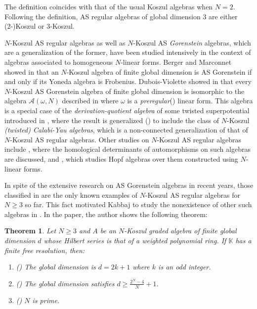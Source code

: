 \documentclass[reqno]{amsart}
\newcommand{\A}{\mathcal{A}}
\newcommand{\bbK}{\mathbb{K}}
\numberwithin{equation}{section}
\theoremstyle{plain}
\newtheorem{thm}[equation]{Theorem}
\theoremstyle{definition}
\begin{document}
The definition coincides with that of the usual Koszul algebras when $N=2$. Following the definition, AS regular algebras of global dimension 3 are either (2-)Koszul or 3-Koszul. 

$N$-Koszul AS regular algebras as well as $N$-Koszul AS \emph{Gorenstein} algebras, which are a generalization of the former, have been studied intensively in the context of algebras associated to homogeneous $N$-linear forms. Berger and Marconnet showed in \cite[Theorem 1.2]{BergerMarconnet} that an $N$-Koszul algebra of finite global dimension is AS Gorenstein if and only if its Yoneda algebra is Frobenius. Dubois-Violette showed in \cite[Theorem 11]{DuboisViolette} that every 
$N$-Koszul AS Gorenstein algebra of finite global dimension is isomorphic to the algebra $\A(\omega, N)$ described in \cite[Section 5]{DuboisViolette} where $\omega$ is a \emph{preregular}(\cite[Definition 2]{DuboisViolette}) linear form. This algebra is a special case of the \emph{derivation-quotient algebra} of some twisted superpotential introduced in \cite{BocklandtSchedlerWemyss}, where the result \cite[Theorem 11]{DuboisViolette} is generalized (\cite[Theorem 6.2]{BocklandtSchedlerWemyss}) to include the class of $N$-Koszul \emph{(twisted) Calabi-Yau algebras}, which is a non-connected generalization of that of $N$-Koszul AS regular algebras. Other studies on $N$-Koszul AS regular algebras include \cite{MoriSmith}, where the homological determinants of automorphisms on such algebras are discussed, and \cite{ChirvasituWaltonWang}, which studies Hopf algebras over them constructed using $N$-linear forms.

In spite of the extensive research on AS Gorenstein algebras in recent years, those classified in \cite{ArtinTateVandenBerghelliptic} are the only known examples of $N$-Koszul AS regular algebras for $N\geq 3$ so far. This fact motivated Kabbaj to study the nonexistence of other such algebras in \cite{Kabbaj}. In the paper, the author shows the following theorem:

\begin{thm}\cite[Theorem 1.2]{Kabbaj}\label{Kabbajmain}
Let $N\geq 3$ and $A$ be an $N$-Koszul graded algebra of finite global dimension $d$ whose Hilbert series is that of a weighted polynomial ring. If $\bbK$ has a finite free resolution, then:
\begin{enumerate}
    \item(\cite[Proposition 3.1, 3.5]{Kabbaj}) The global dimension is $d=2k+1$ where $k$ is an odd integer.
    \item(\cite[Corollary 3.9]{Kabbaj}) The global dimension satisfies $d\geq\frac{2^N-4}{N}+1$.
    \item(\cite[Theorem 3.7]{Kabbaj}) $N$ is prime.
\end{enumerate}
\end{thm}
\end{document}
